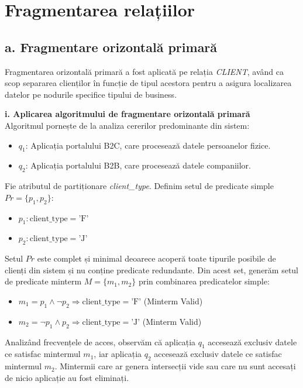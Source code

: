 \chapter{Fragmentarea relațiilor}
\label{chap:fragmentare}

\section*{a. Fragmentare orizontală primară}

Fragmentarea orizontală primară a fost aplicată pe relația \textit{CLIENT}, având ca scop separarea clienților în funcție de tipul acestora pentru a asigura localizarea datelor pe nodurile specifice tipului de business.

\textbf{i. Aplicarea algoritmului de fragmentare orizontală primară}\\
Algoritmul pornește de la analiza cererilor predominante din sistem:
\begin{itemize}
    \item $q_1$: Aplicația portalului B2C, care procesează datele persoanelor fizice.
    \item $q_2$: Aplicația portalului B2B, care procesează datele companiilor.
\end{itemize}

Fie atributul de partiționare \textit{client\_type}. Definim setul de predicate simple $Pr = \{p_1, p_2\}$:
\begin{itemize}
    \item $p_1 : \text{client\_type} = \text{'F'}$
    \item $p_2 : \text{client\_type} = \text{'J'}$
\end{itemize}

Setul $Pr$ este complet și minimal deoarece acoperă toate tipurile posibile de clienți din sistem și nu conține predicate redundante. Din acest set, generăm setul de predicate minterm $M = \{m_1, m_2\}$ prin combinarea predicatelor simple:
\begin{itemize}
    \item $m_1 = p_1 \wedge \neg p_2 \Rightarrow \text{client\_type} = \text{'F'}$ (Minterm Valid)
    \item $m_2 = \neg p_1 \wedge p_2 \Rightarrow \text{client\_type} = \text{'J'}$ (Minterm Valid)
\end{itemize}

Analizând frecvențele de acces, observăm că aplicația $q_1$ accesează exclusiv datele ce satisfac mintermul $m_1$, iar aplicația $q_2$ accesează exclusiv datele ce satisfac mintermul $m_2$. Mintermii care ar genera intersecții vide sau care nu sunt accesați de nicio aplicație au fost eliminați.

